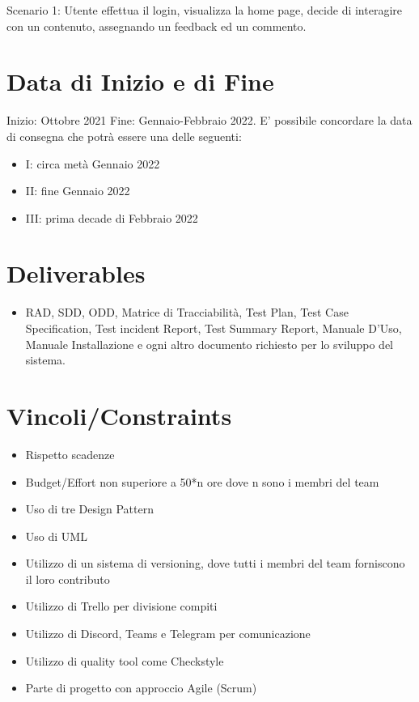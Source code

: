 \documentclass[12pt]{article}
\begin{document}
  Scenario 1:
  Utente effettua il login, visualizza la home page, decide di interagire con un contenuto, assegnando un feedback ed un commento.
  
  \section{Data di Inizio e di Fine}
  Inizio: Ottobre 2021
  Fine: Gennaio-Febbraio 2022. E’ possibile concordare la data di consegna che potrà essere una delle seguenti:
  
  \begin{itemize}
      \item I: circa metà Gennaio 2022
      \item II: fine Gennaio 2022
      \item III: prima decade di Febbraio 2022
  \end{itemize}
  
  \section{Deliverables}
  \begin{itemize}
      \item RAD, SDD, ODD, Matrice di Tracciabilità, Test Plan, Test Case Specification, Test incident Report, Test Summary Report, Manuale D’Uso, Manuale Installazione e ogni altro documento richiesto per lo sviluppo del sistema.
  \end{itemize}
  
  \section{Vincoli/Constraints}
  \begin{itemize}
  \item Rispetto scadenze
  \item Budget/Effort non superiore a 50*n ore dove n sono i membri del team 
  \item Uso di tre Design Pattern
  \item Uso di UML
  \item Utilizzo di un sistema di versioning, dove tutti i membri del team forniscono il loro contributo
  \item Utilizzo di Trello per divisione compiti
  \item Utilizzo di Discord, Teams e Telegram per comunicazione
  \item Utilizzo di quality tool come Checkstyle
  \item Parte di progetto con approccio Agile (Scrum)
  \end{itemize}
  
\end{document}

